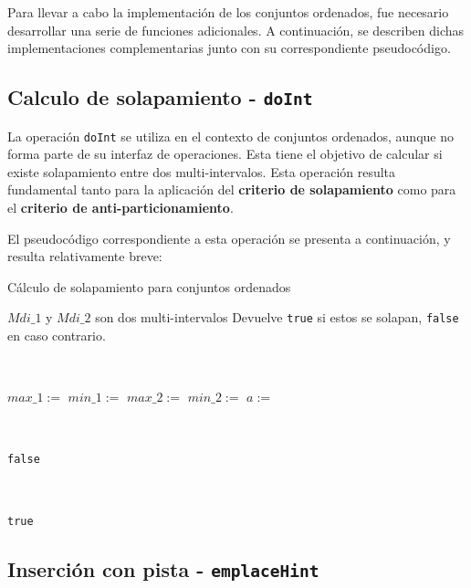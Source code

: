 Para llevar a cabo la implementación de los conjuntos ordenados, fue necesario desarrollar una serie de funciones adicionales. A continuación, se describen dichas implementaciones complementarias junto con su correspondiente pseudocódigo.

\subsection{Calculo de solapamiento - \texttt{doInt}}

La operación \texttt{doInt} se utiliza en el contexto de conjuntos ordenados, aunque no forma parte de su interfaz de operaciones. Esta tiene el objetivo de calcular si existe solapamiento entre dos multi-intervalos. Esta operación resulta fundamental tanto para la aplicación del \textbf{criterio de solapamiento} como para el \textbf{criterio de anti-particionamiento}.

El pseudocódigo correspondiente a esta operación se presenta a continuación, y resulta relativamente breve:


\begin{algorithm}
\caption{Cálculo de solapamiento para conjuntos ordenados}
\begin{algorithmic}[1]
\Require $Mdi\_1$ y $Mdi\_2$ son dos multi-intervalos
\Ensure Devuelve \texttt{true} si estos se solapan, \texttt{false} en caso contrario.

    \
    
    \State $max\_1 :=$ 
    \State $min\_1 :=$ 
    \State $max\_2 :=$ 
    \State $min\_2 :=$ 
    \State $a :=$ 

    \

            \State \Return \texttt{false} 
        \EndIf
    \EndFor

    \
    
    \State \Return \texttt{true} 

\EndFunction
\end{algorithmic}
\end{algorithm}

\subsection{Inserción con pista - \texttt{emplaceHint}}

